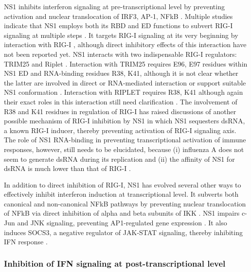 		\gls{NS1} inhibits interferon signaling at pre-transcriptional level by preventing activation and nuclear translocation of IRF3, AP-1, NFkB \parencite{Talon2000, Ludwig2002, Wang2000, Geiss2002, Munir2012}. Multiple studies indicate that NS1 employs both its \gls{RBD} and \gls{ED} functions to subvert \gls{RIG-I} signaling at multiple steps \parencite{Haye2009, Ludwig2002, Tisoncik2011, Wang2000}. It targets \gls{RIG-I} signaling at its very beginning by interaction with \gls{RIG-I}  \parencite{Opitz2007, Mibayashi2007a}, although direct inhibitory effects of this interaction have not been reported yet. NS1 interacts with two indispensable \gls{RIG-I} regulators: TRIM25 and Riplet \parencite{Gack2009, Rajsbaum2012}. Interaction with TRIM25 requires E96, E97 residues within NS1 ED and RNA-binding residues R38, K41, although it is not clear whether the latter are involved in direct or RNA-mediated interaction or support suitable NS1 conformation \parencite{Gack2009}. Interaction with RIPLET requires R38, K41 although again their exact roles in this interaction still need clarification \parencite{Rajsbaum2012}. The involvement of R38 and K41 residues in regulation of RIG-I has raised discussions of another possible mechanism of RIG-I inhibition by NS1 in which NS1 sequesters dsRNA, a known RIG-I inducer, thereby preventing activation of RIG-I signaling axis. The role of NS1 RNA-binding in preventing transcriptional activation of immune responses, however, still needs to be elucidated, because (i) influenza A does not seem to generate dsRNA during its replication \parencite{Wisskirchen2011} and (ii) the affinity of NS1 for dsRNA is much lower than that of RIG-I \parencite{Chien2004, Yin2007, Vela2012}.
		
		In addition to direct inhibition of RIG-I, NS1 has evolved several other ways to  effectively inhibit interferon induction at transcriptional level. It subverts both canonical and non-canonical \gls{NFkB} pathways \parencite{Ruckle2012a} by preventing nuclear translocation of \gls{NFkB} via direct inhibition of alpha and beta subunits of \gls{IKK} \parencite{Gao2012}. \gls{NS1} impairs c-Jun and JNK signaling, preventing \gls{AP1}-regulated gene expression \parencite{Ludwig2002}. It also induces \gls{SOCS3}, a negative regulator of \gls{JAK}-STAT signaling, thereby inhibiting \gls{IFN} response \parencite{Pauli2008}. 
		
		\subsubsection{Inhibition of IFN signaling at post-transcriptional level}
		
